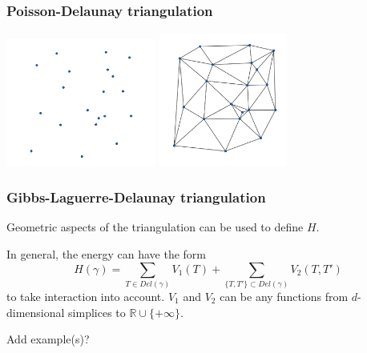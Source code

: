 \documentclass[c, 10pt]{beamer}
\begin{document}
\begin{frame}\frametitle{Poisson-Delaunay triangulation}


\begin{center}
\includegraphics[height = 4.2cm]{./FigureLayout/DelaunayBare.png}
\includegraphics[height = 4.4cm]{./FigureLayout/Delaunay.png}
\end{center}
\end{frame}



\begin{frame}\frametitle{Gibbs-Laguerre-Delaunay triangulation}
\vspace{4mm}

Geometric aspects of the triangulation can be used to define $H$.

In general, the energy can have the form
$$H(\gamma) = \sum_{T \in Del(\gamma)} V_1(T) + \sum_{\{T,T'\} \subset Del (\gamma)} V_2(T,T')$$
to take interaction into account. 
$V_1$ and $V_2$ can be any functions from $d$-dimensional simplices to $\mathbb R \cup \{+ \infty \}$. \newline

Add example(s)?

\end{frame}
\end{document}
